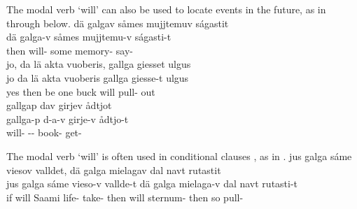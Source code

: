 The modal verb  ‘will’ can also be used to locate events in the future, as in  through  below.
\ea\label{future1}%
\glll	dä galgav såmes mujjtemuv ságastit\\
	dä galga-v såmes mujjtemu-v ságasti-t\\
	then will- some memory- say-\\\nopagebreak
{} 
\z
\ea\label{future2}%
\glll	jo, da lä akta vuoberis, gallga giesset ulgus\\
	jo da lä akta {vuoberis\footnotemark} gallga giesse-t ulgus\\
	yes then be\BS{} one buck\BS{} will\BS{} pull- out\\\nopagebreak
{} 
\z
\ea\label{future3}%
\glll	gallgap dav girjev ådtjot\\
	gallga-p d-a-v girje-v ådtjo-t\\
	will- -- book- get-\\\nopagebreak
{} 
\z

The modal verb  ‘will’ is often used in conditional clauses%
, as in .
\ea\label{condClause1}%
\glll	jus galga sáme viesov valldet, dä galga mielagav dal navt rutastit\\
	jus galga sáme vieso-v vallde-t dä galga mielaga-v dal navt rutasti-t\\
	if will\BS{} Saami\BS{} life- take- then will\BS{} sternum- then so pull-\\\nopagebreak
{} 
\z
{}


